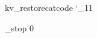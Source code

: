 %
%
\def\skvname                  {simplekv}                             %
\def\skvver                     {0.1}                                %
\def\skvdate                 {2017/08/08}                            %
%
%
%
%

\expandafter\edef\csname skv_restorecatcode
\catcode`\_11

\chardef\skv_stop 0

\def\skv_quark{\skv_quark}

